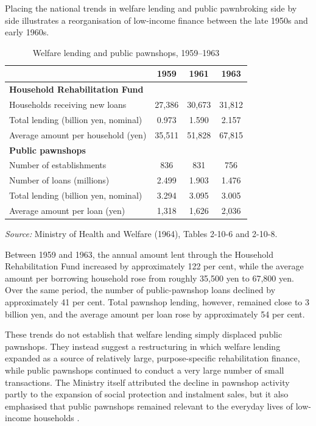 \documentclass[12pt,a4paper]{article}
\begin{document}
Placing the national trends in welfare lending and public pawnbroking side by side illustrates a reorganisation of low-income finance between the late 1950s and early 1960s.

\begin{table}[h]
\centering
\caption{Welfare lending and public pawnshops, 1959--1963}
\label{tab:welfareandpawn}
\begin{tabular}{lccc}
\toprule
 & 1959 & 1961 & 1963 \\
\midrule
\multicolumn{4}{l}{\textbf{Household Rehabilitation Fund}} \\
Households receiving new loans & 27,386 & 30,673 & 31,812 \\
Total lending (billion yen, nominal) & 0.973 & 1.590 & 2.157 \\
Average amount per household (yen) & 35,511 & 51,828 & 67,815 \\
\midrule
\multicolumn{4}{l}{\textbf{Public pawnshops}} \\
Number of establishments & 836 & 831 & 756 \\
Number of loans (millions) & 2.499 & 1.903 & 1.476 \\
Total lending (billion yen, nominal) & 3.294 & 3.095 & 3.005 \\
Average amount per loan (yen) & 1,318 & 1,626 & 2,036 \\
\bottomrule
\end{tabular}
\end{table}

\noindent\emph{Source:} Ministry of Health and Welfare (1964), Tables 2-10-6 and 2-10-8.

Between 1959 and 1963, the annual amount lent through the Household Rehabilitation Fund increased by approximately 122 per cent, while the average amount per borrowing household rose from roughly 35,500 yen to 67,800 yen. Over the same period, the number of public-pawnshop loans declined by approximately 41 per cent. Total pawnshop lending, however, remained close to 3 billion yen, and the average amount per loan rose by approximately 54 per cent.

These trends do not establish that welfare lending simply displaced public pawnshops. They instead suggest a restructuring in which welfare lending expanded as a source of relatively large, purpose-specific rehabilitation finance, while public pawnshops continued to conduct a very large number of small transactions. The Ministry itself attributed the decline in pawnshop activity partly to the expansion of social protection and instalment sales, but it also emphasised that public pawnshops remained relevant to the everyday lives of low-income households \citep{MinistryofHealthandWelfare1963, MinistryofHealthandWelfare1964}.
\end{document}
